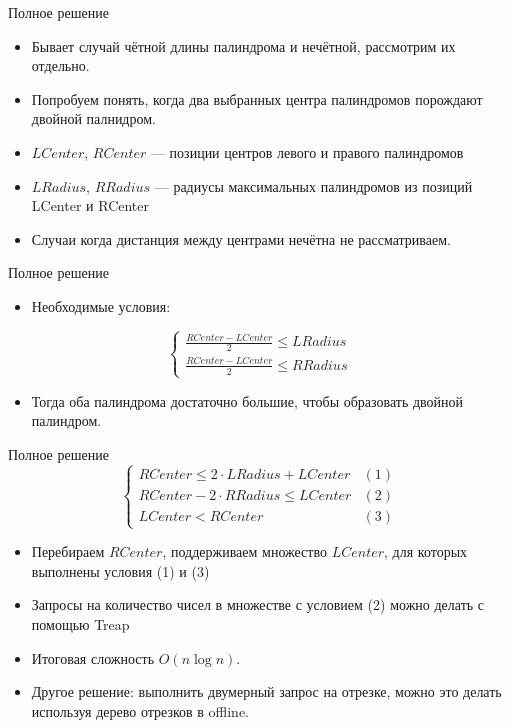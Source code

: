 \begin{frame}{Полное решение}
  \begin{itemize}
  \item Бывает случай чётной длины палиндрома и нечётной, рассмотрим их отдельно.
  \item Попробуем понять, когда два выбранных центра палиндромов порождают двойной палнидром.
  \item $LCenter$, $RCenter$ --- позиции центров левого и правого палиндромов
  \item $LRadius$, $RRadius$ --- радиусы максимальных палиндромов из позиций LCenter и RCenter
  \item Случаи когда дистанция между центрами нечётна не рассматриваем.
  \end{itemize}
\end{frame}

\begin{frame}{Полное решение}
  \begin{itemize}
  \item Необходимые условия:
  \end{itemize}
  \begin{equation*}
    \begin{cases}
      \frac{RCenter - LCenter}{2} \leq LRadius 
      \\
      \frac{RCenter - LCenter}{2} \leq RRadius
    \end{cases}
  \end{equation*}

  \begin{itemize}
  \item Тогда оба палиндрома достаточно большие, чтобы образовать двойной палиндром.
  \end{itemize}
\end{frame}

\begin{frame}{Полное решение}
  \vspace{-2em}
  \begin{equation*}
    \begin{cases}
      RCenter \leq 2 \cdot LRadius + LCenter & (1)
      \\
      RCenter - 2 \cdot RRadius \leq LCenter  & (2)
      \\
      LCenter < RCenter & (3)
    \end{cases}
  \end{equation*}
  \begin{itemize}
  \item Перебираем $RCenter$, поддерживаем множество $LCenter$, для которых выполнены условия (1) и (3)
  \item Запросы на количество чисел в множестве с условием (2) можно делать с помощью Treap
  \item Итоговая сложность $O(n \log{n})$.
  \item Другое решение: выполнить двумерный запрос на отрезке, можно это делать используя дерево отрезков в offline.
  \end{itemize}
\end{frame}
